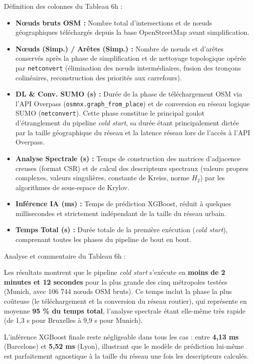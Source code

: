 \documentclass[10pt, a4paper]{article}
\providecommand{\tightlist}{}
\begin{document}
Définition des colonnes du Tableau 6h :

\begin{itemize}
\tightlist
\item
  \textbf{Nœuds bruts OSM :} Nombre total d'intersections et de nœuds
  géographiques téléchargés depuis la base OpenStreetMap avant
  simplification.
\item
  \textbf{Nœuds (Simp.) / Arêtes (Simp.) :} Nombre de nœuds et d'arêtes
  conservés après la phase de simplification et de nettoyage topologique
  opérée par \texttt{netconvert} (élimination des nœuds intermédiaires,
  fusion des tronçons colinéaires, reconstruction des priorités aux
  carrefours).
\item
  \textbf{DL \& Conv. SUMO (s) :} Durée de la phase de téléchargement
  OSM via l'API Overpass (\texttt{osmnx.graph\_from\_place}) et de
  conversion en réseau logique SUMO (\texttt{netconvert}). Cette phase
  constitue le principal goulot d'étranglement du pipeline \emph{cold
  start}, sa durée étant principalement dictée par la taille
  géographique du réseau et la latence réseau lors de l'accès à l'API
  Overpass.
\item
  \textbf{Analyse Spectrale (s) :} Temps de construction des matrices
  d'adjacence creuses (format CSR) et de calcul des descripteurs
  spectraux (valeurs propres complexes, valeurs singulières, constante
  de Kreiss, norme \(H_2\)) par les algorithmes de sous-espace de
  Krylov.
\item
  \textbf{Inférence IA (ms) :} Temps de prédiction XGBoost, réduit à
  quelques millisecondes et strictement indépendant de la taille du
  réseau urbain.
\item
  \textbf{Temps Total (s) :} Durée totale de la première exécution
  (\emph{cold start}), comprenant toutes les phases du pipeline de bout
  en bout.
\end{itemize}

Analyse et commentaire du Tableau 6h :

Les résultats montrent que le pipeline \emph{cold start} s'exécute en
\textbf{moins de 2 minutes et 12 secondes} pour la plus grande des cinq
métropoles testées (Munich, avec 106 744 nœuds OSM bruts). Ce temps
inclut la phase la plus coûteuse (le téléchargement et la conversion du
réseau routier), qui représente en moyenne \textbf{95 \% du temps
total}, l'analyse spectrale étant elle-même très rapide (de 1,3 s pour
Bruxelles à 9,9 s pour Munich).

L'inférence XGBoost finale reste négligeable dans tous les cas : entre
\textbf{4,13 ms} (Barcelone) et \textbf{5,52 ms} (Lyon), illustrant que
le modèle de prédiction lui-même est parfaitement agnostique à la taille
du réseau une fois les descripteurs calculés.
\end{document}
